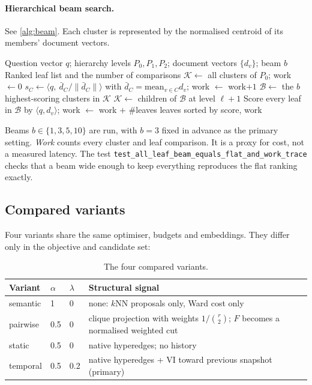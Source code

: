 \documentclass[11pt,a4paper]{article}
\newcommand{\cref}[1]{\autoref{#1}}
\theoremstyle{remark}
\newcommand{\code}[1]{\texttt{\small #1}}
\begin{document}
\paragraph{Hierarchical beam search.} See \cref{alg:beam}. Each cluster is represented
by the normalised centroid of its members' document vectors.

\begin{algorithm}[!htbp]
\caption{Coarse-to-fine beam retrieval}
\label{alg:beam}
\begin{algorithmic}[1]
\Require Question vector $q$; hierarchy levels $P_0,P_1,P_2$; document vectors $\{d_v\}$; beam $b$
\Ensure Ranked leaf list and the number of comparisons
\State $\mathcal K\gets$ all clusters of $P_0$; \quad work $\gets0$
     \State $s_C\gets \langle q,\ \bar d_C/\|\bar d_C\|\rangle$ with $\bar d_C=\mathrm{mean}_{v\in C}d_v$; \quad work $\gets$ work$+1$
  \EndFor
  \State $\mathcal B\gets$ the $b$ highest-scoring clusters in $\mathcal K$
   $\mathcal K\gets$ children of $\mathcal B$ at level $\ell+1$ \EndIf
\EndFor
\State Score every leaf in $\mathcal B$ by $\langle q,d_v\rangle$; \quad work $\gets$ work $+$ \#leaves
\State \Return leaves sorted by score, work
\end{algorithmic}
\end{algorithm}

Beams $b\in\{1,3,5,10\}$ are run, with $b=3$ fixed in advance as the primary setting.
\emph{Work} counts every cluster and leaf comparison. It is a proxy for cost, not a
measured latency. The test \code{test\_all\_leaf\_beam\_equals\_flat\_and\_work\_trace}
checks that a beam wide enough to keep everything reproduces the flat ranking exactly.

\subsection{Compared variants}

Four variants share the same optimiser, budgets and embeddings. They differ only in the
objective and candidate set:

\begin{table}[!htbp]
\centering
\caption{The four compared variants.}
\label{tab:variants}
\begin{tabularx}{\linewidth}{lllX}
\toprule
Variant & $\alpha$ & $\lambda$ & Structural signal\\
\midrule
semantic & 1 & 0 & none: $k$NN proposals only, Ward cost only\\
pairwise & 0.5 & 0 & clique projection with weights $1/\binom r2$; $F$ becomes a normalised weighted cut\\
static & 0.5 & 0 & native hyperedges; no history\\
temporal & 0.5 & 0.2 & native hyperedges + VI toward previous snapshot (primary)\\
\bottomrule
\end{tabularx}
\end{table}
\end{document}
